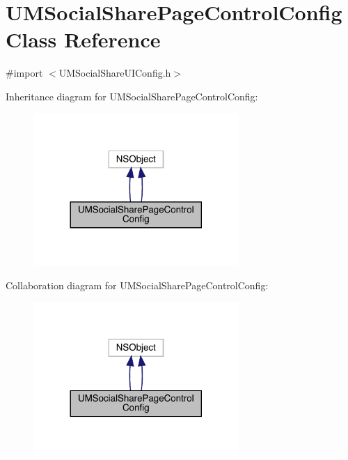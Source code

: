 \hypertarget{interface_u_m_social_share_page_control_config}{}\section{U\+M\+Social\+Share\+Page\+Control\+Config Class Reference}
\label{interface_u_m_social_share_page_control_config}


{\ttfamily \#import $<$U\+M\+Social\+Share\+U\+I\+Config.\+h$>$}



Inheritance diagram for U\+M\+Social\+Share\+Page\+Control\+Config\+:\nopagebreak
\begin{figure}[H]
\begin{center}
\leavevmode
\includegraphics[width=221pt]{interface_u_m_social_share_page_control_config__inherit__graph}
\end{center}
\end{figure}


Collaboration diagram for U\+M\+Social\+Share\+Page\+Control\+Config\+:\nopagebreak
\begin{figure}[H]
\begin{center}
\leavevmode
\includegraphics[width=221pt]{interface_u_m_social_share_page_control_config__coll__graph}
\end{center}
\end{figure}
